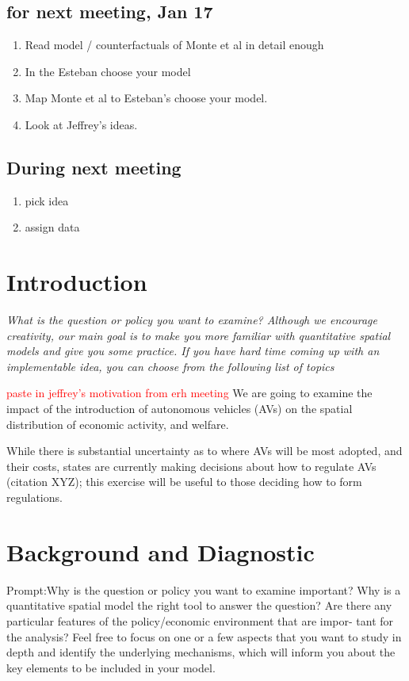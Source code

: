 \documentclass{article}
\begin{document}
\subsection{ for next meeting, Jan 17 }
\begin{enumerate}
    \item Read model / counterfactuals of Monte et al in detail enough 
    \item In the Esteban choose your model 
    \item Map Monte et al to Esteban's choose your model. 
    \item Look at Jeffrey's ideas. 
\end{enumerate}



\subsection{During next meeting}
\begin{enumerate}
    \item pick idea
    \item assign data 
\end{enumerate}


\section{Introduction}
\textit{What is the question or policy you want to examine? Although we encourage
creativity, our main goal is to make you more familiar with quantitative spatial models
and give you some practice. If you have hard time coming up with an implementable
idea, you can choose from the following list of topics}


\textcolor{red}{paste in jeffrey's motivation from erh meeting}
We are going to examine the impact of the introduction of autonomous vehicles (AVs) on the spatial distribution of economic activity, and welfare.

While there is substantial uncertainty as to where AVs will be most adopted, and their costs, states are currently making decisions about how to regulate AVs (citation XYZ); this exercise will be useful to those deciding how to form regulations.




\section{Background and Diagnostic}
Prompt:Why is the question or policy you want to examine
important? Why is a quantitative spatial model the right tool to answer the question?
Are there any particular features of the policy/economic environment that are impor-
tant for the analysis? Feel free to focus on one or a few aspects that you want to study
in depth and identify the underlying mechanisms, which will inform you about the key
elements to be included in your model.
\end{document}
